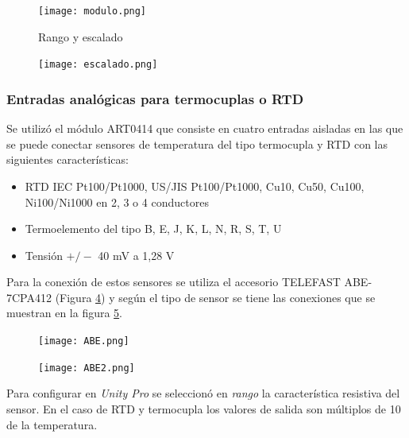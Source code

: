 \begin{figure}[H]
	\centering
	\texttt{[image: modulo.png]}
	\label{fig:modulo}
\end{figure}

\begin{figure}[htbp]
	\centering
	\caption{Rango y escalado} \label{fig:param}
\end{figure}




\begin{figure}[H]
	\centering
	\texttt{[image: escalado.png]}
	\label{fig:escalado}
\end{figure}


\subsubsection{Entradas analógicas para termocuplas o RTD}
Se utilizó el módulo ART0414 que consiste en cuatro entradas aisladas en las que se puede conectar sensores de temperatura del tipo termocupla y RTD con las siguientes características:
\begin{itemize}
	\item RTD IEC Pt100/Pt1000, US/JIS Pt100/Pt1000, Cu10, Cu50, Cu100, Ni100/Ni1000 en 2, 3 o 4 conductores
	\item Termoelemento del tipo B, E, J, K, L, N, R, S, T, U
\item 	Tensión $+/-$ 40 mV a 1,28 V
	
\end{itemize}

Para la conexión de estos sensores se utiliza el accesorio TELEFAST ABE-7CPA412 (Figura \ref{fig:ABE}) y según el tipo de sensor se tiene las conexiones que se muestran en la figura \ref{fig:ABE2}.

\begin{figure}[H]
	\centering
	\texttt{[image: ABE.png]}
	\label{fig:ABE}
\end{figure}
\begin{figure}[H]
	\centering
	\texttt{[image: ABE2.png]}
	\label{fig:ABE2}
\end{figure}

Para configurar en \textit{Unity Pro} se seleccionó en \textit{rango} la característica resistiva del sensor. En el caso de RTD y termocupla los valores de salida son múltiplos de 10 de la temperatura. 

